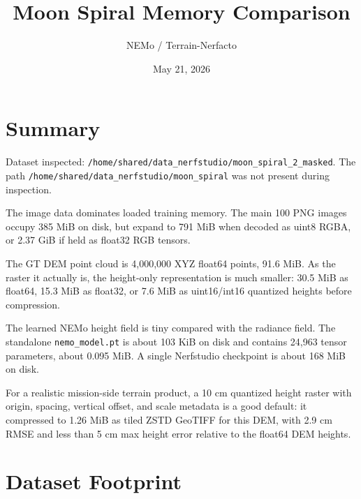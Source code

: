 \documentclass[10pt]{article}
\title{Moon Spiral Memory Comparison}
\author{NEMo / Terrain-Nerfacto}
\date{May 21, 2026}
\begin{document}
\setlength{\emergencystretch}{3em}
\maketitle

\section{Summary}

Dataset inspected: \texttt{/home/shared/data\_nerfstudio/moon\_spiral\_2\_masked}. The path \texttt{/home/shared/data\_nerfstudio/moon\_spiral} was not present during inspection.

The image data dominates loaded training memory. The main 100 PNG images occupy 385 MiB on disk, but expand to 791 MiB when decoded as uint8 RGBA, or 2.37 GiB if held as float32 RGB tensors.

The GT DEM point cloud is 4,000,000 XYZ float64 points, 91.6 MiB. As the raster it actually is, the height-only representation is much smaller: 30.5 MiB as float64, 15.3 MiB as float32, or 7.6 MiB as uint16/int16 quantized heights before compression.

The learned NEMo height field is tiny compared with the radiance field. The standalone \texttt{nemo\_model.pt} is about 103 KiB on disk and contains 24,963 tensor parameters, about 0.095 MiB. A single Nerfstudio checkpoint is about 168 MiB on disk.

For a realistic mission-side terrain product, a 10 cm quantized height raster with origin, spacing, vertical offset, and scale metadata is a good default: it compressed to 1.26 MiB as tiled ZSTD GeoTIFF for this DEM, with 2.9 cm RMSE and less than 5 cm max height error relative to the float64 DEM heights.

\section{Dataset Footprint}
\end{document}
